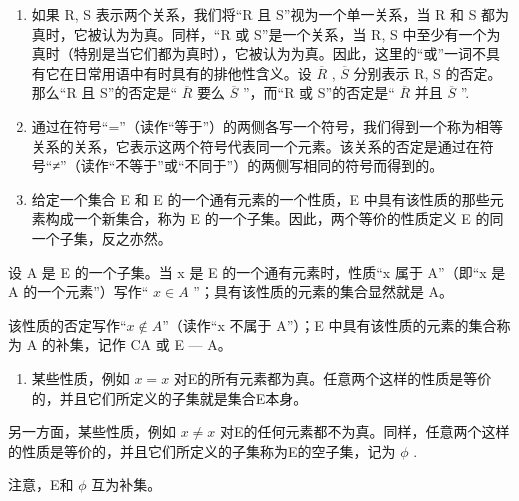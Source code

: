 \begin{enumerate}
\def\labelenumi{\arabic{enumi}.}
\setcounter{enumi}{4}
\item
  如果 R, S 表示两个关系，我们将“R 且 S”视为一个单一关系，当 R 和 S 都为真时，它被认为为真。同样，“R 或 S”是一个关系，当 R, S 中至少有一个为真时（特别是当它们都为真时），它被认为为真。因此，这里的“或”一词不具有它在日常用语中有时具有的排他性含义。设 \(\overline{R}\) , \(\overline{S}\) 分别表示 R, S 的否定。那么“R 且 S”的否定是“ \(\overline{R}\) 要么 \(\overline{S}\) ”，而“R 或 S”的否定是“ \(\overline{R}\) 并且 \(\overline{S}\) ''.
\item
  通过在符号“=”（读作“等于”）的两侧各写一个符号，我们得到一个称为相等关系的关系，它表示这两个符号代表同一个元素。该关系的否定是通过在符号“≠”（读作“不等于”或“不同于”）的两侧写相同的符号而得到的。
\item
  给定一个集合 E 和 E 的一个通有元素的一个性质，E 中具有该性质的那些元素构成一个新集合，称为 E 的一个子集。因此，两个等价的性质定义 E 的同一个子集，反之亦然。
\end{enumerate}

设 A 是 E 的一个子集。当 x 是 E 的一个通有元素时，性质“x 属于 A”（即“x 是 A 的一个元素”）写作“ \(x \in A\) ”；具有该性质的元素的集合显然就是 A。

该性质的否定写作“\(x \notin A\)”（读作“x 不属于 A”）；E 中具有该性质的元素的集合称为 A 的补集，记作 CA 或 E --- A。

\begin{enumerate}
\def\labelenumi{\arabic{enumi}.}
\setcounter{enumi}{7}
\tightlist
\item
  某些性质，例如 \(x = x\) 对E的所有元素都为真。任意两个这样的性质是等价的，并且它们所定义的子集就是集合E本身。
\end{enumerate}

另一方面，某些性质，例如 \(x \neq x\) 对E的任何元素都不为真。同样，任意两个这样的性质是等价的，并且它们所定义的子集称为E的空子集，记为 \(\phi\) .

注意，E和 \(\phi\) 互为补集。

